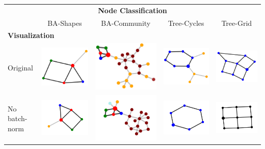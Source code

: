 \begin{table}[]
\centering
\begin{tabular}{lllll}
\toprule
\multicolumn{5}{c}{\textbf{Node Classification}} \\
\multicolumn{1}{c}{} & \multicolumn{1}{c}{BA-Shapes} & \multicolumn{1}{c}{BA-Community} & \multicolumn{1}{c}{Tree-Cycles} & \multicolumn{1}{c}{Tree-Grid} \\ \hline
\multicolumn{5}{l}{\textbf{Visualization}} \\ \hline
Original &  \includegraphics[width=.1\linewidth]{../openreview/imgs/their_image-1.png}
& \includegraphics[width=.1\linewidth]{../openreview/imgs/their_image-2.png} & \includegraphics[width=.1\linewidth]{../openreview/imgs/their_image-3.png} & \multicolumn{1}{l}{\includegraphics[width=.1\linewidth]{../openreview/imgs/their_image-4.png}} \\
No batch-norm &  \includegraphics[width=.1\linewidth]{../openreview/imgs/simplification/syn1_pg.png}
& \includegraphics[width=.1\linewidth]{../openreview/imgs/simplification/syn2_pg.png} & \includegraphics[width=.1\linewidth]{../openreview/imgs/simplification/syn3_pg.png} & \multicolumn{1}{l}{\includegraphics[width=.1\linewidth]{../openreview/imgs/simplification/syn4_pg.png}} \\

\end{tabular}
\end{table}

